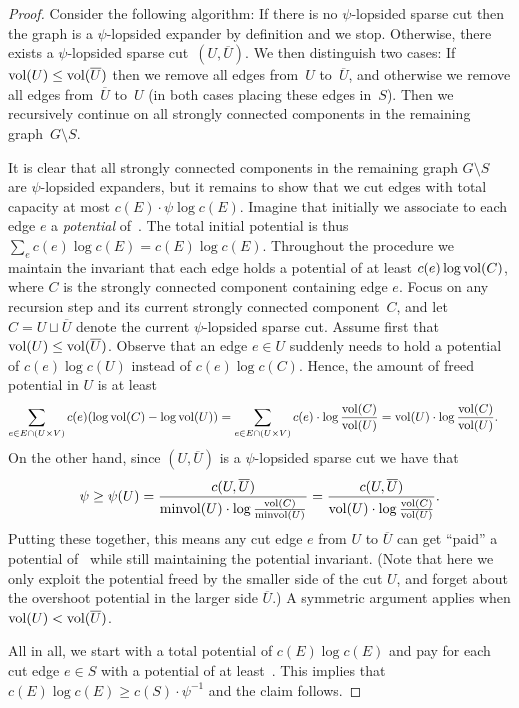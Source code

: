 \documentclass[letterpaper,11pt]{article}
\begin{document}
\lemLexpDecomp*

\begin{proof}
Consider the following algorithm: If there is no $\psi$-lopsided sparse cut then the graph is a $\psi$-lopsided expander by definition and we stop. Otherwise, there exists a $\psi$-lopsided sparse cut~$(U, \overline U)$. We then distinguish two cases: If $\operatorname{vol}(U) \leq \operatorname{vol}(\overline U)$ then we remove all edges from~$U$ to~$\overline U$, and otherwise we remove all edges from~$\overline U$ to~$U$ (in both cases placing these edges in~$S$). Then we recursively continue on all strongly connected components in the remaining graph~$G \setminus S$. 

It is clear that all strongly connected components in the remaining graph $G \setminus S$ are $\psi$-lopsided expanders, but it remains to show that we cut edges with total capacity at most $c(E) \cdot \psi \log c(E)$. Imagine that initially we associate to each edge $e$ a \emph{potential} of~. The total initial potential is thus $\sum_e c(e) \log c(E) = c(E) \log c(E)$. Throughout the procedure we maintain the invariant that each edge holds a potential of at least $c(e) \log \operatorname{vol}(C)$, where $C$ is the strongly connected component containing edge $e$. Focus on any recursion step and its current strongly connected component~$C$, and let $C = U \sqcup \overline U$ denote the current $\psi$-lopsided sparse cut. Assume first that $\operatorname{vol}(U) \leq \operatorname{vol}(\overline U)$. Observe that an edge $e \in U$ suddenly needs to hold a potential of $c(e)\log c(U)$ instead of $c(e)\log c(C)$. Hence, the amount of freed potential in $U$ is at least
\begin{align*}
	\sum_{e \in E \cap (U \times V)} c(e) (\log \operatorname{vol}(C) - \log \operatorname{vol}(U)) &=
	\sum_{e \in E \cap (U \times V)} c(e)  \cdot \log \frac{\operatorname{vol}(C)}{\operatorname{vol}(U)} = \operatorname{vol}(U) \cdot \log \frac{\operatorname{vol}(C)}{\operatorname{vol}(U)}.
\end{align*}
On the other hand, since $(U, \overline U)$ is a $\psi$-lopsided sparse cut we have that
\begin{equation*}
	\psi \geq \psi(U) = \frac{c(U, \overline U)}{\operatorname{minvol}(U) \cdot \log \frac{\operatorname{vol}(C)}{\operatorname{minvol}(U)}} = \frac{c(U, \overline U)}{\operatorname{vol}(U) \cdot \log \frac{\operatorname{vol}(C)}{\operatorname{vol}(U)}}.
\end{equation*}
Putting these together, this means any cut edge $e$ from $U$ to $\overline U$ can get ``paid'' a potential of~ while still maintaining the potential invariant. (Note that here we only exploit the potential freed by the smaller side of the cut $U$, and forget about the overshoot potential in the larger side $\overline U$.) A symmetric argument applies when $\operatorname{vol}(U) < \operatorname{vol}(\overline U)$.

All in all, we start with a total potential of $c(E) \log c(E)$ and pay for each cut edge $e \in S$ with a potential of at least~. This implies that $c(E) \log c(E) \geq c(S) \cdot \psi^{-1}$ and the claim follows.
\end{proof}
\end{document}
